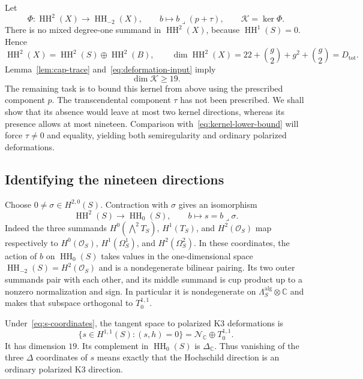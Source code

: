 \documentclass[11pt]{article}
\numberwithin{equation}{section}
\theoremstyle{definition}
\theoremstyle{remark}
\begin{document}
Let
\[
 \Phi:\operatorname{HH}^2(X)\longrightarrow\operatorname{HH}_{-2}(X),\qquad
 b\longmapsto b\mathbin{\lrcorner}(p+\tau),\qquad
 \mathcal K=\ker\Phi.
\]
There is no mixed degree-one summand in $\operatorname{HH}^2(X)$, because
$\operatorname{HH}^1(S)=0$. Hence
\begin{equation}\label{eq:HH-domain-dimension}
 \operatorname{HH}^2(X)=\operatorname{HH}^2(S)\oplus\operatorname{HH}^2(B),\qquad
 \dim\operatorname{HH}^2(X)=22+\binom g2+g^2+\binom g2=D_{\mathrm{tot}}.
\end{equation}
Lemma~\ref{lem:cap-trace} and~\eqref{eq:deformation-input} imply
\begin{equation}\label{eq:kernel-lower-bound}
 \dim \mathcal K\ge19.
\end{equation}
The remaining task is to bound this kernel from above using the
prescribed component $p$. The transcendental component $\tau$ has
not been prescribed. We shall show that its absence would leave
at most two kernel directions, whereas its presence allows at
most nineteen. Comparison with~\eqref{eq:kernel-lower-bound} will
force $\tau\ne0$ and equality, yielding both semiregularity and
ordinary polarized deformations.

\subsection{Identifying the nineteen directions}

Choose $0\ne\sigma\in H^{2,0}(S)$. Contraction with $\sigma$ gives
an isomorphism
\begin{equation}\label{eq:s-coordinates}
 \operatorname{HH}^2(S)\longrightarrow\operatorname{HH}_0(S),\qquad b\longmapsto s=b\lrcorner\sigma.
\end{equation}
Indeed the three summands $H^0(\bigwedge^2T_S)$, $H^1(T_S)$, and
$H^2(\mathcal O_S)$ map respectively to $H^0(\mathcal O_S)$,
$H^1(\Omega_S^1)$, and $H^2(\Omega_S^2)$.
In these coordinates, the action of $b$ on $\operatorname{HH}_0(S)$ takes values
in the one-dimensional space $\operatorname{HH}_{-2}(S)=H^2(\mathcal O_S)$ and is
a nondegenerate bilinear pairing. Its two outer summands pair with
each other, and its middle summand is cup product up to a nonzero
normalization and sign. In particular it is nondegenerate on
$\Lambda_S^{\mathrm{alg}}\otimes\mathbb C$ and makes that subspace
orthogonal to $T_0^{1,1}$.

Under~\eqref{eq:s-coordinates}, the tangent space to polarized K3
deformations is
\begin{equation}\label{eq:polarized-K3-tangent}
 \{s\in H^{1,1}(S):(s,h)=0\}
       =\mathcal N_\mathbb C\oplus T_0^{1,1}.
\end{equation}
It has dimension $19$. Its complement in $\operatorname{HH}_0(S)$ is $\Delta_\mathbb C$.
Thus vanishing of the three $\Delta$ coordinates of $s$ means exactly
that the Hochschild direction is an ordinary polarized K3 direction.
\end{document}
